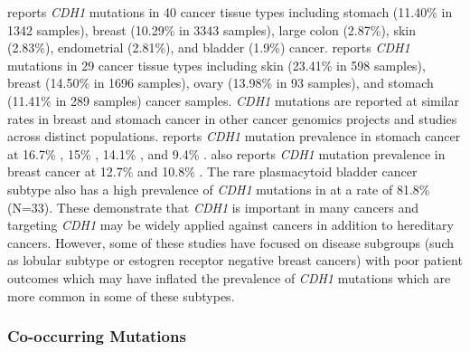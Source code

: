 \citet{COSMICdb} reports \textit{CDH1} \glspl{mutation} in 40 cancer tissue types including stomach (11.40\% in 1342 samples), breast (10.29\% in 3343 samples), large colon (2.87\%), skin (2.83\%), endometrial (2.81\%), and bladder (1.9\%) cancer. \citet{ICGC2017web} reports \textit{CDH1} \glspl{mutation} in 29 cancer tissue types including skin (23.41\% in 598 samples), breast (14.50\% in 1696 samples), ovary (13.98\% in 93 samples), and stomach (11.41\% in 289 samples) cancer samples. \textit{CDH1} \glspl{mutation} are reported at similar rates in breast and stomach cancer in other cancer \glspl{genomic} projects and studies across distinct populations. \citet{cBioPortal} reports \textit{CDH1} \gls{mutation} prevalence in stomach cancer at 16.7\% \citep[30 samples]{Kakiuchi2014}, 15\% \citep[100 samples]{Wang2014}, 14.1\% \citep[78 samples]{Chen2015}, and 9.4\% \citep[393 samples]{TCGA2017prov}. \citet{cBioPortal} also reports \textit{CDH1} \gls{mutation} prevalence in breast cancer at 12.7\% \citep[963 samples]{TCGA2017prov} and 10.8\% \citep[2051 samples]{METABRIC2012, METABRIC2016}. The rare plasmacytoid bladder cancer subtype also has a high prevalence of \textit{CDH1} \glspl{mutation} in \citet{COSMICdb} at a rate of 81.8\% (N=33). These demonstrate that \textit{CDH1} is important in many cancers and targeting \textit{CDH1} may be widely applied against  cancers in addition to \gls{hereditary} cancers. However, some of these studies have focused on disease subgroups (such as lobular subtype or estogren receptor negative breast cancers) with poor patient outcomes which may have inflated the prevalence of \textit{CDH1} \glspl{mutation} which are more common in some of these subtypes.

\subsubsection{Co-occurring Mutations}

